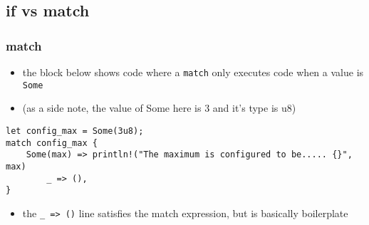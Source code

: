 \documentclass[11pt]{article}
\begin{document}
\subsection{if vs match}
\label{sec:orgdda7599}
\subsubsection{match}
\label{sec:org4db8bec}
\begin{itemize}
\item the block below shows code where a \texttt{match} only executes code when a value is \texttt{Some}
\item (as a side note, the value of Some here is 3 and it's type is u8)
\end{itemize}
\begin{verbatim}
let config_max = Some(3u8);
match config_max {
    Some(max) => println!("The maximum is configured to be..... {}", max)
        _ => (), 
}
\end{verbatim}
\begin{itemize}
\item the \texttt{\_ => ()} line satisfies the match expression, but is basically boilerplate
\end{itemize}
\end{document}
